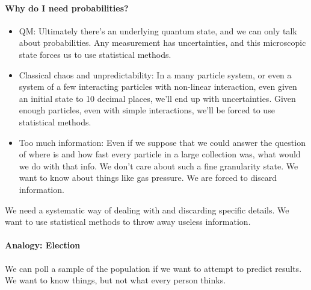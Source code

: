 %
%
%
\paragraph{Why do I need probabilities?}
%
\begin{itemize}
\item QM: Ultimately there's an underlying quantum state, and we can only talk about probabilities.  Any measurement has uncertainties, and this microscopic state forces us to use statistical methods.
\item Classical chaos and unpredictability: In a many particle system, or even a system of a few interacting particles with non-linear interaction, even given an initial state to 10 decimal places, we'll end up with uncertainties.  Given enough particles, even with simple interactions, we'll be forced to use statistical methods.
\item Too much information: Even if we suppose that we could answer the question of where is and how fast every particle in a large collection was, what would we do with that info.  We don't care about such a fine granularity state.  We want to know about things like gas pressure.  We are forced to discard information.
\end{itemize}
%
We need a systematic way of dealing with and discarding specific details.  We want to use statistical methods to throw away useless information.
%
\paragraph{Analogy: Election}
%
We can poll a sample of the population if we want to attempt to predict results.  We want to know things, but not what every person thinks.
%
